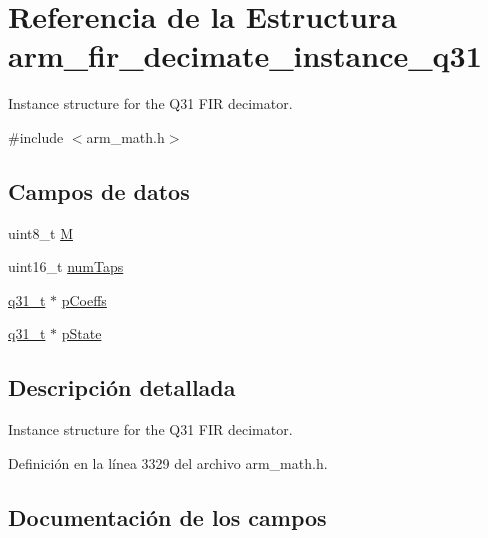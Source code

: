 \hypertarget{structarm__fir__decimate__instance__q31}{}\section{Referencia de la Estructura arm\+\_\+fir\+\_\+decimate\+\_\+instance\+\_\+q31}
\label{structarm__fir__decimate__instance__q31}


Instance structure for the Q31 F\+IR decimator.  




{\ttfamily \#include $<$arm\+\_\+math.\+h$>$}

\subsection*{Campos de datos}
\begin{DoxyCompactItemize}
\item 
uint8\+\_\+t \hyperlink{structarm__fir__decimate__instance__q31_ae2c8107d00d3c9942e7a20fc598edecf}{M}
\item 
uint16\+\_\+t \hyperlink{structarm__fir__decimate__instance__q31_a751941891e47f522a7f5375fe8990aac}{num\+Taps}
\item 
\hyperlink{arm__math_8h_adc89a3547f5324b7b3b95adec3806bc0}{q31\+\_\+t} $\ast$ \hyperlink{structarm__fir__decimate__instance__q31_a68888e36167d81cb7836db10367a1682}{p\+Coeffs}
\item 
\hyperlink{arm__math_8h_adc89a3547f5324b7b3b95adec3806bc0}{q31\+\_\+t} $\ast$ \hyperlink{structarm__fir__decimate__instance__q31_adee4ba3ee8869865af7d8fa08ca913d6}{p\+State}
\end{DoxyCompactItemize}


\subsection{Descripción detallada}
Instance structure for the Q31 F\+IR decimator. 

Definición en la línea 3329 del archivo arm\+\_\+math.\+h.



\subsection{Documentación de los campos}
